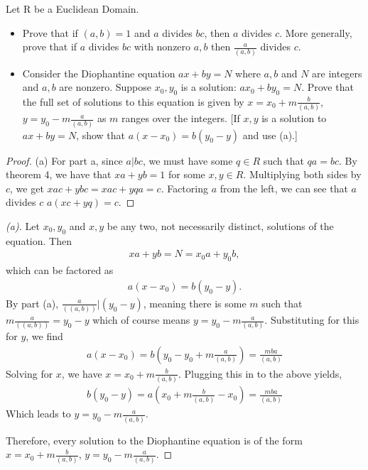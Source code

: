 \documentclass[10pt]{article}
\newenvironment{problem}[2][Problem]{\begin{trivlist}
		\item[\hskip \labelsep {\bfseries #1}\hskip \labelsep {\bfseries #2.}]}{\end{trivlist}}
\begin{document}
	\begin{problem}{1.4}
		Let R be a Euclidean Domain.
		\begin{itemize}
			\item[\textbf{(a)}] Prove that if $(a,b)=1$ and $a$ divides $bc$, then $a$ divides $c$. More generally, prove that if $a$ divides $bc$ with nonzero $a,b$ then $\frac{a}{(a,b)}$ divides $c$.
			\item[\textbf{(b)}] Consider the Diophantine equation $ax+by=N$ where $a,b$ and $N$ are integers and $a,b$ are nonzero. Suppose $x_{0}, y_{0}$ is a solution: $ax_{0}+by_{0}=N$. Prove that the full set of solutions to this equation is given by
			$x=x_{0} + m \frac{b}{(a,b)}$, $y=y_{0} - m \frac{a}{(a,b)}$
			as $m$ ranges over the integers. [If $x,y$ is a solution to $ax+by=N$, show that $a(x-x_{0}) = b(y_{0} - y)$ and use (a).]
		\end{itemize}
	
	
		\begin{proof}{(a)}
			For part a, since $a|bc$, we must have some $q \in R$ such that $qa = bc$. By theorem 4, we have that $xa + yb = 1$ for some $x,y \in R$. Multiplying both sides by $c$, we get $xac + ybc = xac + yqa = c$. Factoring $a$ from the left, we can see that $a$ divides $c$ $a(xc + yq)=c$.
		\end{proof}
		\begin{proof}[(a)]
			Let $x_0, y_0$ and $x, y$ be any two, not necessarily distinct, solutions of the equation. Then 
			\begin{align*}
				xa + yb = N = x_{0}a + y_{0}b,
			\end{align*}
			which can be factored as 
			\begin{align*}
				a(x-x_{0}) = b(y_{0} - y).
			\end{align*}
			By part (a), $\frac{a}{((a,b))} | (y_{0} - y)$, meaning there is some $m$ such that $m\frac{a}{((a,b))} = y_{0} - y$ which of course means $y = y_{0} - m \frac{a}{(a,b)}$. Substituting for this for $y$, we find 
			\begin{align*}
				a(x-x_{0}) = b(y_{0} - y_{0} + m\frac{a}{(a,b)}) = \frac{mba}{(a,b)}
			\end{align*}
			Solving for $x$, we have $x = x_{0} + m \frac{b}{(a,b)}$. Plugging this in to the above yields,
			\begin{align*}
				b(y_{0} - y) = a(x_{0} + m \frac{b}{(a,b)}-x_{0}) = \frac{mba}{(a,b)}
			\end{align*}
			Which leads to $y=y_{0} - m \frac{a}{(a,b)}$.
			
			Therefore, every solution to the Diophantine equation is of the form $x=x_{0} + m \frac{b}{(a,b)}$, $y=y_{0} - m \frac{a}{(a,b)}$.
		\end{proof}
	\end{problem}
	
\end{document}

